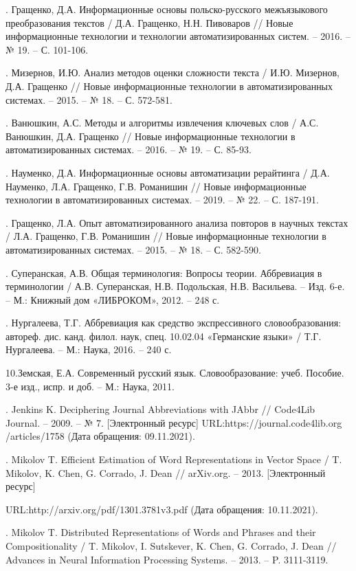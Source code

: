 \documentclass[12pt]{article}
\begin{document}
. Гращенко, Д.А. Информационные основы польско-русского межъязыкового преобразования текстов / Д.А. Гращенко, Н.Н. Пивоваров // Новые информационные технологии и технологии автоматизированных систем. – 2016. – № 19. – С. 101-106.
    
. Мизернов, И.Ю. Анализ методов оценки сложности текста / И.Ю. Мизернов, Д.А. Гращенко // Новые информационные технологии в автоматизированных системах. – 2015. – № 18. – С. 572-581.
    
. Ванюшкин, А.С. Методы и алгоритмы извлечения ключевых слов / А.С. Ванюшкин, Д.А. Гращенко // Новые информационные технологии в автоматизированных системах. – 2016. – № 19. – С. 85-93.
    
. Науменко, Д.А. Информационные основы автоматизации рерайтинга / Д.А. Науменко, Л.А. Гращенко, Г.В. Романишин // Новые информационные технологии в автоматизированных системах. – 2019. – № 22. – С. 187-191.
    
. Гращенко, Л.А. Опыт автоматизированного анализа повторов в научных текстах / Л.А. Гращенко, Г.В. Романишин // Новые информационные технологии в автоматизированных системах. – 2015. – № 18. – С. 582-590.

. Суперанская, А.В. Общая терминология: Вопросы теории. Аббревиация в терминологии / А.В. Суперанская, Н.В. Подольская, Н.В. Васильева. – Изд. 6-е. – М.: Книжный дом «ЛИБРОКОМ», 2012. – 248 с.

. Нургалеева, Т.Г. Аббревиация как средство экспрессивного словообразования: автореф. дис. канд. филол. наук, спец. 10.02.04 «Германские языки» / Т.Г. Нургалеева. – М.: Наука, 2016. – 240 с.

\noindent     10.Земская, Е.А. Современный русский язык. Словообразование: учеб. Пособие. 3-е изд., испр. и доб. – М.: Наука, 2011.

. Jenkins K. Deciphering Journal Abbreviations with JAbbr // Code4Lib Journal. – 2009. – № 7. [Электронный ресурс] URL:https://journal.code4lib.org /articles/1758 (Дата обращения: 09.11.2021).

. Mikolov T. Efficient Estimation of Word Representations in Vector Space / T. Mikolov, K. Chen, G. Corrado, J. Dean // arXiv.org. – 2013. [Электронный ресурс]

\noindent     URL:http://arxiv.org/pdf/1301.3781v3.pdf (Дата обращения: 10.11.2021).

. Mikolov T. Distributed Representations of Words and Phrases and their Compositionality / T. Mikolov, I. Sutskever, K. Chen, G. Corrado, J. Dean // Advances in Neural Information Processing Systems. – 2013. – P. 3111-3119.
\end{document}
